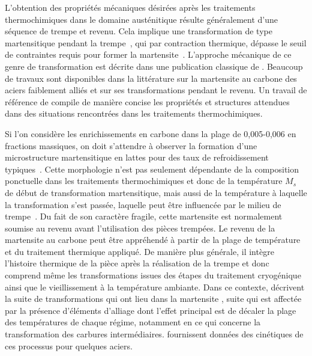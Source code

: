 L'obtention des propriétés mécaniques désirées après les traitements thermochimiques dans le domaine austénitique résulte généralement d'une séquence de trempe et revenu. Cela implique une transformation de type martensitique pendant la trempe~\cite{Steel2006}, qui par contraction thermique, dépasse le seuil de contraintes requis pour former la martensite~\cite{Khachaturyan1983}. L'approche mécanique de ce genre de transformation est décrite dans une publication classique de \citet{Kurdjumov1976}. Beaucoup de travaux sont disponibles dans la littérature sur la martensite au carbone des aciers faiblement alliés et sur ses transformations pendant le revenu. Un travail de référence de \citet{Krauss1999} compile de manière concise les propriétés et structures attendues dans des situations rencontrées dans les traitements thermochimiques.

Si l'on considère les enrichissements en carbone dans la plage de 0,005-0,006 en fractions massiques, on doit s'attendre à observer la formation d'une microstructure martensitique en lattes pour des taux de refroidissement typiques~\cite{Krauss1999}. Cette morphologie n'est pas seulement dépendante de la composition \textendash{} ponctuelle dans les traitements thermochimiques \textendash{} et donc de la température $M_{s}$ de début de transformation martensitique, mais aussi de la température à laquelle la transformation s'est passée, laquelle peut être influencée par le milieu de trempe~\cite{Umemoto1983}. Du fait de son caractère fragile, cette martensite est normalement soumise au revenu avant l'utilisation des pièces trempées. Le revenu de la martensite au carbone peut être appréhendé à partir de la plage de température et du traitement thermique appliqué. De manière plus générale, il intègre l'histoire thermique de la pièce après la réalisation de la trempe et donc comprend même les transformations issues des étapes du traitement cryogénique ainsi que le vieillissement à la température ambiante. Dans ce contexte, \citet{Cheng1988} décrivent la suite de transformations qui ont lieu dans la martensite , suite qui est affectée par la présence d'éléments d'alliage dont l'effet principal est de décaler la plage des températures de chaque régime, notamment en ce qui concerne la transformation des carbures intermédiaires. \citet{Morra2001} fournissent données des cinétiques de ces processus pour quelques aciers.

